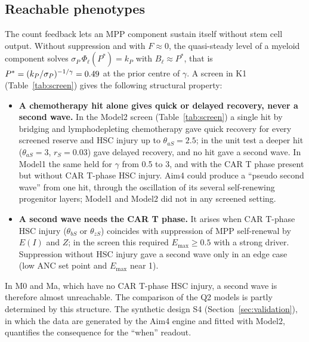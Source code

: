 \documentclass[11pt]{article}
\begin{document}
\subsection{Reachable phenotypes}\label{sec:reachable}
The count feedback lets an MPP component sustain itself without stem cell output. Without suppression and with $F\approx0$, the quasi-steady level of a myeloid component solves $\sigma_P\,\Phi_\ell(P^\ast)=k_P$ with $B_\ell\approx P^\ast$, that is $P^\ast=(k_P/\sigma_P)^{-1/\gamma}=0.49$ at the prior centre of $\gamma$. A screen in K1 (Table~\ref{tab:screen}) gives the following structural property:
\begin{itemize}
\item \textbf{A chemotherapy hit alone gives quick or delayed recovery, never a second wave.} In the Model2 screen (Table~\ref{tab:screen}) a single hit by bridging and lymphodepleting chemotherapy gave quick recovery for every screened reserve and HSC injury up to $\theta_{aS}=2.5$; in the unit test a deeper hit ($\theta_{aS}=3$, $r_S=0.03$) gave delayed recovery, and no hit gave a second wave. In Model1 the same held for $\gamma$ from 0.5 to 3, and with the CAR T phase present but without CAR T-phase HSC injury. Aim4 could produce a ``pseudo second wave'' from one hit, through the oscillation of its several self-renewing progenitor layers; Model1 and Model2 did not in any screened setting.
\item \textbf{A second wave needs the CAR T phase.} It arises when CAR T-phase HSC injury ($\theta_{bS}$ or $\theta_{zS}$) coincides with suppression of MPP self-renewal by $E(I)$ and $Z$; in the screen this required $E_{\max}\geq0.5$ with a strong driver. Suppression without HSC injury gave a second wave only in an edge case (low ANC set point and $E_{\max}$ near 1).
\end{itemize}
In M0 and Ma, which have no CAR T-phase HSC injury, a second wave is therefore almost unreachable. The comparison of the Q2 models is partly determined by this structure. The synthetic design S4 (Section~\ref{sec:validation}), in which the data are generated by the Aim4 engine and fitted with Model2, quantifies the consequence for the ``when'' readout.



\end{document}
